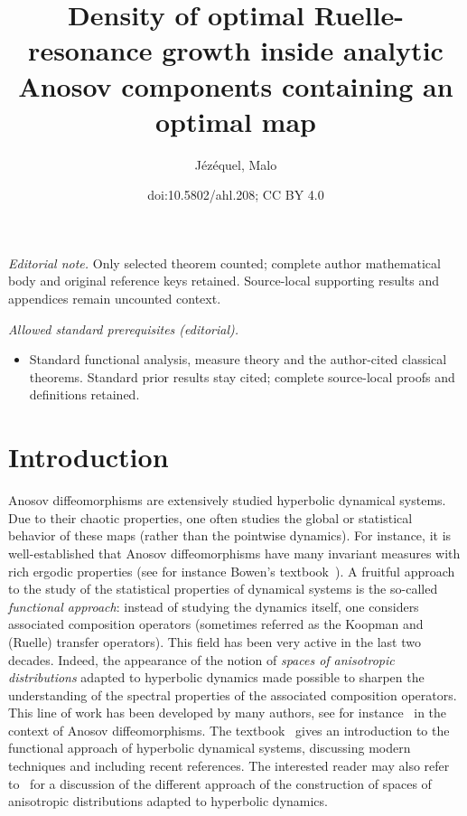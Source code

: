 \documentclass[10pt]{amsart}
\title{Density of optimal Ruelle-resonance growth inside analytic Anosov components containing an optimal map}
\author{Jézéquel, Malo}
\date{doi:10.5802/ahl.208; CC BY 4.0}
\theoremstyle{definition}\newtheorem{defi}[theo]{Definition}\newtheorem{rema}[theo]{Remark}\newtheorem{exam}[theo]{Example}\newtheorem{exem}[theo]{Example}\newtheorem{nota}[theo]{Notation}
\begin{document}
\maketitle
\noindent\textit{Editorial note.} Only selected theorem counted; complete author mathematical body and original reference keys retained. Source-local supporting results and appendices remain uncounted context.\par\medskip
\noindent\textit{Allowed standard prerequisites (editorial).}\begin{itemize}
\item Standard functional analysis, measure theory and the author-cited classical theorems. Standard prior results stay cited; complete source-local proofs and definitions retained.
\end{itemize}\medskip

\section{Introduction}

Anosov diffeomorphisms are extensively studied hyperbolic dynamical systems. Due to their chaotic properties, one often studies the global or statistical behavior of these maps (rather than the pointwise dynamics). For instance, it is well-established that Anosov diffeomorphisms have many invariant measures with rich ergodic properties (see for instance Bowen's textbook~\cite{bowen_book}). A fruitful approach to the study of the statistical properties of dynamical systems is the so-called \emph{functional approach}: instead of studying the dynamics itself, one considers associated composition operators (sometimes referred as the Koopman and (Ruelle) transfer operators). This field has been very active in the last two decades. Indeed, the appearance of the notion of \emph{spaces of anisotropic distributions} adapted to hyperbolic dynamics made possible to sharpen the understanding of the spectral properties of the associated composition operators. This line of work has been developed by many authors, see for instance~\cite{blank_keller_liverani, baladi_tsujii, baladi_tsujii_determinant, faure_roy_sjostrand,
gouezel_liverani_1, gouezel_liverani_2} in the context of Anosov diffeomorphisms. The textbook~\cite{baladi_book} gives an introduction to the functional approach of hyperbolic dynamical systems, discussing modern techniques and including recent references. The interested reader may also refer to~\cite{baladi_quest} for a discussion of the different approach of the construction of spaces of anisotropic distributions adapted to hyperbolic dynamics.
\end{document}
